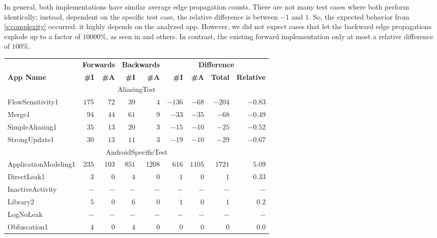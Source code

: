 \documentclass[../draft.tex]{subfiles}
\begin{document}
    In general, both implementations have similar average edge propagation counts. 
    There are not many test cases where both perform identically; instead, dependent on the specific test case, the relative difference is between $-1$ and $1$. 
    So, the expected behavior from \autoref{s:complexity} occurred: it highly depends on the analyzed app.
    However, we did not expect cases that let the backward edge propagations explode up to a factor of $10 000\%$, as seen in  and others. 
    In contrast, the existing forward implementation only at most a relative difference of $100\%$.

    \footnotesize
    \newcommand{\tsubEight}[1]{\multicolumn{9}{c}{#1}\\\hline}
    \begin{longtable}{l | r | r | r | r | r | r | r | r}
        \centering
        & \multicolumn{2}{c|}{\textbf{Forwards}} & \multicolumn{2}{c|}{\textbf{Backwards}} & \multicolumn{4}{c}{\textbf{Difference}}\\
        \textbf{App Name} & \textbf{\#I} & \textbf{\#A} & \textbf{\#I} & \textbf{\#A} & \textbf{\#I} & \textbf{\#A}& \textbf{Total} & \textbf{Relative}\\
        \hline\hline
        \endhead
        \hline
        \tsubEight{AliasingTest}
        FlowSensitivity1 & $175$ & $72$ & $39$ & $4$ & $-136$ & $-68$ & $-204$ & $-0.83$\\
        Merge1 & $94$ & $44$ & $61$ & $9$ & $-33$ & $-35$ & $-68$ & $-0.49$\\
        SimpleAliasing1 & $35$ & $13$ & $20$ & $3$ & $-15$ & $-10$ & $-25$ & $-0.52$\\
        StrongUpdate1 & $30$ & $13$ & $11$ & $3$ & $-19$ & $-10$ & $-29$ & $-0.67$\\
        \hline
        \tsubEight{AndroidSpecificTest}
        ApplicationModeling1 & $235$ & $103$ & $851$ & $1208$ & $616$ & $1105$ & $1721$ & $5.09$\\
        DirectLeak1 & $3$ & $0$ & $4$ & $0$ & $1$ & $0$ & $1$ & $0.33$\\
        InactiveActivity & $-$ & $-$ & $-$ & $-$ & $-$ & $-$ & $-$ & $-$\\
        Library2 & $5$ & $0$ & $6$ & $0$ & $1$ & $0$ & $1$ & $0.2$\\
        LogNoLeak & $-$ & $-$ & $-$ & $-$ & $-$ & $-$ & $-$ & $-$\\
        Obfuscation1 & $4$ & $0$ & $4$ & $0$ & $0$ & $0$ & $0$ & $0.0$\\

\end{longtable}
\end{document}
